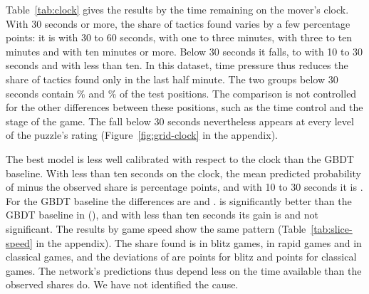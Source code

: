 \documentclass[11pt]{article}
\begin{document}
Table~\ref{tab:clock} gives the results by the time remaining on the mover's
clock. With 30 seconds or more, the share of tactics found varies by a few
percentage points: it is  with 30 to 60 seconds,
 with one to three minutes,
 with three to ten minutes and
 with ten minutes or more. Below 30 seconds it
falls, to  with 10 to 30 seconds and
 with less than ten. In this dataset, time
pressure thus reduces the share of tactics found only in the last half
minute. The two groups below 30 seconds contain \%
and \% of the test positions. The comparison is
not controlled for the other differences between these positions, such as the
time control and the stage of the game. The fall below 30 seconds nevertheless appears at every
level of the puzzle's rating (Figure~\ref{fig:grid-clock} in the appendix).

\begin{table}[htbp]\centering\footnotesize
{}
\caption{Test-set results by the time remaining on the mover's clock, in
seconds.}
\label{tab:clock}
\end{table}

The best model is less well calibrated with respect to the clock than the
GBDT baseline. With less than ten seconds on the clock, the mean predicted
probability of  minus the observed share is
 percentage points, and with 10 to 30
seconds it is . For the GBDT baseline the
differences are  and
.  is significantly
better than the GBDT baseline in 
(), and with less than ten seconds its gain is
 and not significant. The results by game speed show
the same pattern (Table~\ref{tab:slice-speed} in the appendix). The share
found is  in blitz games,
 in rapid games and
 in classical games, and the deviations of
 are  points for blitz
and  points for classical games. The
network's predictions thus depend less on the time available than the
observed shares do. We have not identified the cause.
\end{document}
